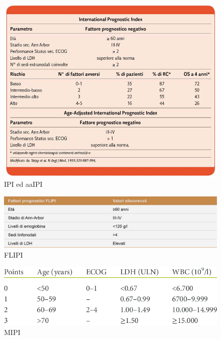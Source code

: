 \begin{figure}[H]
    \begin{center}
    \includegraphics[width=0.8\columnwidth]{img/IPI-AAIPI.jpeg}
    \end{center}
    \caption[IPI ed aaIPI]{IPI ed aaIPI
    \cite{img18}}

\end{figure}

\begin{figure}[H]
    \begin{center}
    \includegraphics[width=0.8\columnwidth]{img/FLIPI.png}
    \end{center}
    \caption[FLIPI]{FLIPI
    \cite{img19}}

\end{figure}

\begin{figure}[H]
    \begin{center}
    \includegraphics[width=0.8\columnwidth]{img/MIPI.png}
    \end{center}
    \caption[MIPI]{MIPI
    \cite{img20}}

\end{figure}

